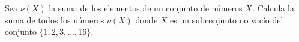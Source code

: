 Sea $\nu(X)$ la suma de los elementos de un conjunto de números $X$. Calcula la suma de todos los números $\nu(X)$ donde $X$ es un subconjunto no vacío del conjunto $\{1, 2, 3, \dots, 16\}$.